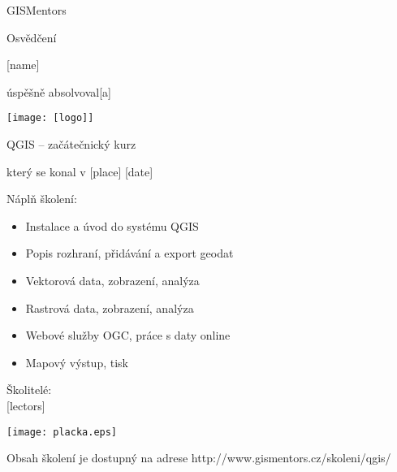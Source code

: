 \documentclass[12pt, a4paper]{letter}
\begin{document}
\pagestyle{empty}
\begin{center}

{\Large GISMentors}

{\Huge Osvědčení}

{\Large [name]}

úspěšně absolvoval[a]

\texttt{[image: [logo]]}

{\Large QGIS -- začátečnický kurz}

který se konal v [place] [date]
\end{center}

Náplň školení:

\begin{itemize}
    \item Instalace a úvod do systému QGIS
    \item Popis rozhraní, přidávání a export geodat
    \item Vektorová data, zobrazení, analýza
    \item Rastrová data, zobrazení, analýza
    \item Webové služby OGC, práce s daty online
    \item Mapový výstup, tisk
\end{itemize}

\vfill
\parbox{7cm}{
        Školitelé: \\

        [lectors]
}
\hfill
\parbox{3cm}{
    \texttt{[image: placka.eps]}
}


\begin{center}
{\footnotesize Obsah školení je dostupný na adrese
http://www.gismentors.cz/skoleni/qgis/}
\end{center}
\end{document}

